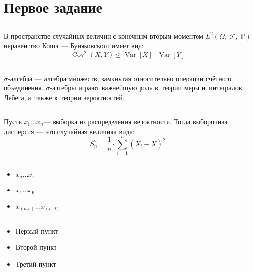 \documentclass[12pt, a4paper]{article}
\DeclareMathOperator{\Var}{Var}
\DeclareMathOperator{\Cov}{Cov}
\begin{document}
\section{Первое задание}
\subsection{}
\renewcommand{\theequation}{Eq.(\arabic{equation})}
В пространстве случайных величин с конечным вторым моментом 
$L^2(\Omega,\;\mathcal{F},\;\mathbb{P})$ неравенство Коши --- Буняковского имеет вид:\\
\begin{equation}
\Cov^2(X,Y)\leq\Var[X]\cdot\Var[Y]
\end{equation}
\subsection{}
\newcommand{\s}{\ensuremath{\sigma}}
\s-алгебра --- алгебра множеств, замкнутая относительно операции счётного объединения. \s-алгебры играют важнейшую роль в~теории меры и~интегралов Лебега, а~также в~теории вероятностей.
\subsection{}
\newcommand{\X}{\ensuremath{x_1 \ldots x_n}}
Пусть \X --- выборка из распределения вероятности. Тогда выборочная дисперсия --- это случайная величина вида:\\
\begin{equation}
S_n^2=\frac{1}{n}\cdot\sum_{i=1}^{n}(X_i-\bar{X})^2
\end{equation}
\subsection{}
\newcommand{\com}[2]{\ensuremath{x_{#1}\ldots x_{#2}}}
\begin{itemize}
\item \com{a}{z}\\
\item \com{1}{6}\\
\item \com{(a,b)}{(c,d)}
\end{itemize}
\subsection{}
\begin{itemize}
\item Первый пункт
\item Второй пункт
\item Третий пункт
\end{itemize}
\end{document}
